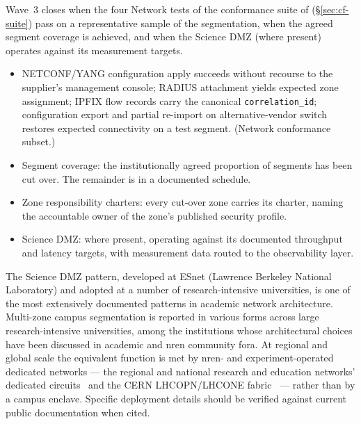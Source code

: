 Wave~3 closes when the four Network tests of the conformance suite
of  (\S\ref{sec:cf-suite}) pass on a
representative sample of the segmentation, when the agreed segment
coverage is achieved, and when the Science DMZ (where present)
operates against its measurement targets.

\begin{itemize}[leftmargin=1.5em,nosep]
  \item NETCONF/YANG configuration apply succeeds without recourse
    to the supplier's management console; RADIUS attachment yields
    expected zone assignment; IPFIX flow records carry the
    canonical \texttt{correlation\_id}; configuration export and
    partial re-import on alternative-vendor switch restores
    expected connectivity on a test segment. (Network conformance
    subset.)
  \item Segment coverage: the institutionally agreed proportion of
    segments has been cut over. The remainder is in a documented
    schedule.
  \item Zone responsibility charters: every cut-over zone carries
    its charter, naming the accountable owner of the zone's
    published security profile.
  \item Science DMZ: where present, operating against its
    documented throughput and latency targets, with measurement
    data routed to the observability layer.
\end{itemize}

\begin{realworldbox}
\noindent The Science DMZ pattern, developed at ESnet (Lawrence
Berkeley National Laboratory) and adopted at a number of
research-intensive universities, is one of the most extensively
documented patterns in academic network architecture. Multi-zone
campus segmentation is reported in various forms across large
research-intensive universities, among the institutions whose
architectural choices have been discussed in academic and
\gls{nren} community fora. At regional and
global scale the equivalent function is met by \gls{nren}- and
experiment-operated dedicated networks --- the regional and national
research and education networks' dedicated
circuits~\cite{geant} and the
CERN LHCOPN/LHCONE fabric~\cite{cern-lhcone} --- rather than
by a campus enclave. Specific deployment details should be verified
against current public documentation when cited.
\end{realworldbox}

